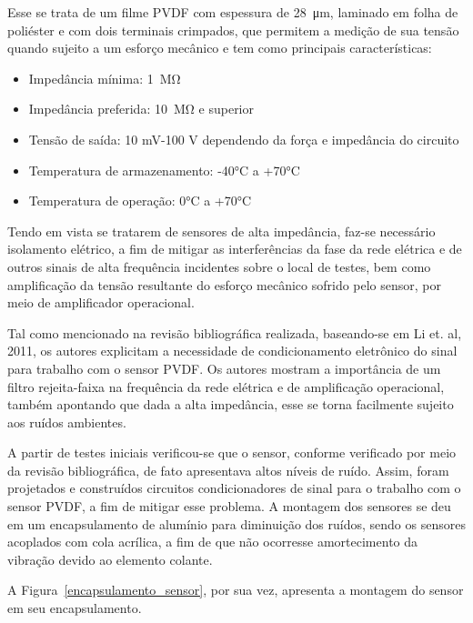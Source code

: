 \documentclass[
	12pt,				
	oneside,			
	a4paper,			
	english,			
	brazil,			
	]{abntex2ppgsi}
\begin{document}
Esse se trata de um filme PVDF com espessura de \SI{28}{\micro\meter}, laminado em folha de poliéster e com dois terminais crimpados, que permitem a medição de sua tensão quando sujeito a um esforço mecânico e tem como principais características: 

\begin{itemize}
	\item Impedância mínima: \SI{1}{\mega\ohm}
	\item Impedância preferida: \SI{10}{\mega\ohm} e superior
	\item Tensão de saída: 10 mV-100 V dependendo da força e impedância do circuito
	\item Temperatura de armazenamento: -40°C a +70°C 
	\item Temperatura de operação: 0°C a +70°C
\end{itemize}

Tendo em vista se tratarem de sensores de alta impedância, faz-se necessário isolamento elétrico, a fim de mitigar as interferências da fase da rede elétrica e de outros sinais de alta frequência incidentes sobre o local de testes, bem como amplificação da tensão resultante do esforço mecânico sofrido pelo sensor, por meio de amplificador operacional. 

Tal como mencionado na revisão bibliográfica realizada, baseando-se em Li et. al, 2011, os autores explicitam a necessidade de condicionamento eletrônico do sinal para trabalho com o sensor PVDF. Os autores mostram a importância de um filtro rejeita-faixa na frequência da rede elétrica e de amplificação operacional, também apontando que dada a alta impedância, esse se torna facilmente sujeito aos ruídos ambientes. 

A partir de testes iniciais verificou-se que o sensor, conforme verificado por meio da revisão bibliográfica, de fato apresentava altos níveis de ruído. Assim, foram projetados e construídos circuitos condicionadores de sinal para o trabalho com o sensor PVDF, a fim de mitigar esse problema. A montagem dos sensores se deu em um encapsulamento de alumínio para diminuição dos ruídos, sendo os sensores acoplados com cola acrílica, a fim de que não ocorresse amortecimento da vibração devido ao elemento colante.

A Figura~\ref{encapsulamento_sensor}, por sua vez, apresenta a montagem do sensor em seu encapsulamento.
\end{document}
